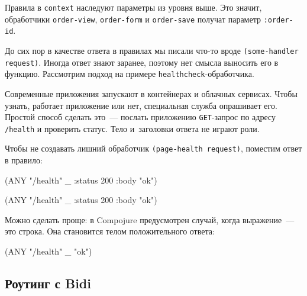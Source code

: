 \fi

Правила в \verb|context| наследуют параметры из уровня выше. Это значит,
обработчики \verb|order-view|, \verb|order-form| и \verb|order-save|
получат параметр \verb|:order-id|.

До сих пор в качестве ответа в правилах мы писали что-то вроде
\verb|(some-handler request)|. Иногда ответ знают заранее, поэтому нет смысла
выносить его в функцию. Рассмотрим подход на примере
\verb|healthcheck|-обработчика.

Современные приложения запускают в контейнерах и облачных сервисах. Чтобы
узнать, работает приложение или нет, специальная служба опрашивает его. Простой
способ сделать это~--- послать приложению \verb|GET|-запрос по адресу
\verb|/health| и проверить статус. Тело и~заголовки ответа не играют роли.

Чтобы не создавать лишний обработчик \verb|(page-health request)|, поместим
ответ в правило:


\ifx\DEVICETYPE\MOBILE

\begin{english}
  \begin{clojure}
(ANY "/health" _
     {:status 200 :body "ok"})
  \end{clojure}
\end{english}

\else

\begin{english}
  \begin{clojure}
(ANY "/health" _ {:status 200 :body "ok"})
  \end{clojure}
\end{english}

\fi


Можно сделать проще: в Compojure предусмотрен случай, когда выражение~--- это
строка. Она становится телом положительного ответа:

\begin{english}
  \begin{clojure}
(ANY "/health" _ "ok")
  \end{clojure}
\end{english}

\subsection{Роутинг с Bidi}


